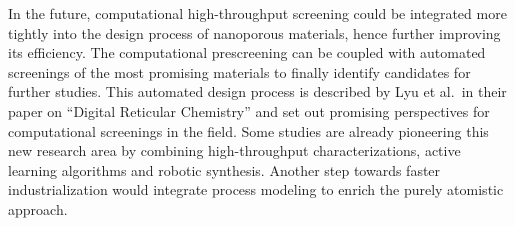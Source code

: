 \documentclass[main.tex]{subfiles}
\begin{document}
In the future, computational high-throughput screening could be integrated more tightly into the design process of nanoporous materials, hence further improving its efficiency. The computational prescreening can be coupled with automated screenings of the most promising materials to finally identify candidates for further studies. This automated design process is described by Lyu et al.\ in their paper on ``Digital Reticular Chemistry'' and set out promising perspectives for computational screenings in the field.\cite{Lyu_2020} Some studies are already pioneering this new research area by combining high-throughput characterizations, active learning algorithms and robotic synthesis.\cite{Greenaway_2018,Moosavi_2019} Another step towards faster industrialization would integrate process modeling to enrich the purely atomistic approach.

\OnlyInSubfile{\printglobalbibliography}
\end{document}
